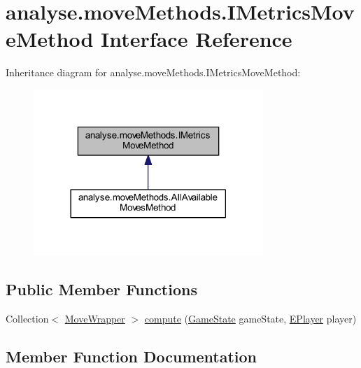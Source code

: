 \hypertarget{interfaceanalyse_1_1move_methods_1_1_i_metrics_move_method}{}\section{analyse.\+move\+Methods.\+I\+Metrics\+Move\+Method Interface Reference}
\label{interfaceanalyse_1_1move_methods_1_1_i_metrics_move_method}


Inheritance diagram for analyse.\+move\+Methods.\+I\+Metrics\+Move\+Method\+:
\nopagebreak
\begin{figure}[H]
\begin{center}
\leavevmode
\includegraphics[width=246pt]{interfaceanalyse_1_1move_methods_1_1_i_metrics_move_method__inherit__graph}
\end{center}
\end{figure}
\subsection*{Public Member Functions}
\begin{DoxyCompactItemize}
\item 
Collection$<$ \mbox{\hyperlink{classanalyse_1_1_move_wrapper}{Move\+Wrapper}} $>$ \mbox{\hyperlink{interfaceanalyse_1_1move_methods_1_1_i_metrics_move_method_a140fc54c9b5b634c25ea2064b4642f6f}{compute}} (\mbox{\hyperlink{classgame_1_1game_state_1_1_game_state}{Game\+State}} game\+State, \mbox{\hyperlink{enumgame_1_1_e_player}{E\+Player}} player)
\end{DoxyCompactItemize}


\subsection{Member Function Documentation}
\mbox{\label{interfaceanalyse_1_1move_methods_1_1_i_metrics_move_method_a140fc54c9b5b634c25ea2064b4642f6f}} 
